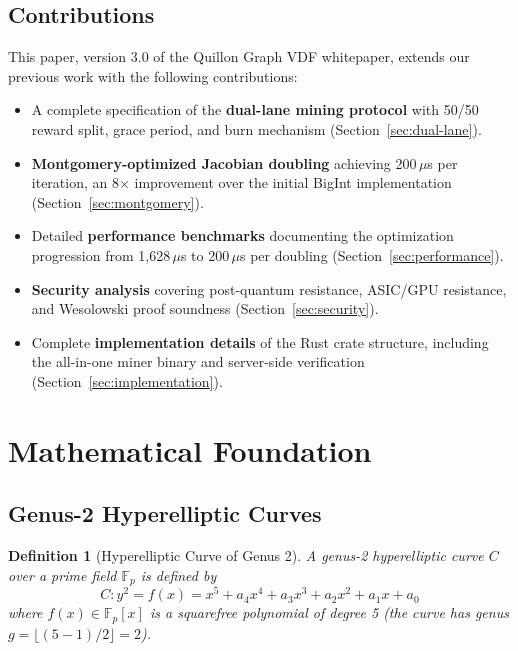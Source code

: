\documentclass[11pt,a4paper]{article}
\newtheorem{definition}{Definition}[section]
\begin{document}
\subsection{Contributions}

This paper, version 3.0 of the Quillon Graph VDF whitepaper, extends our previous work \cite{qnk_vdf_v2} with the following contributions:

\begin{itemize}
    \item A complete specification of the \textbf{dual-lane mining protocol} with 50/50 reward split, grace period, and burn mechanism (Section~\ref{sec:dual-lane}).
    \item \textbf{Montgomery-optimized Jacobian doubling} achieving 200\,$\mu$s per iteration, an 8$\times$ improvement over the initial BigInt implementation (Section~\ref{sec:montgomery}).
    \item Detailed \textbf{performance benchmarks} documenting the optimization progression from 1,628\,$\mu$s to 200\,$\mu$s per doubling (Section~\ref{sec:performance}).
    \item \textbf{Security analysis} covering post-quantum resistance, ASIC/GPU resistance, and Wesolowski proof soundness (Section~\ref{sec:security}).
    \item Complete \textbf{implementation details} of the Rust crate structure, including the all-in-one miner binary and server-side verification (Section~\ref{sec:implementation}).
\end{itemize}

\section{Mathematical Foundation}
\label{sec:math}

\subsection{Genus-2 Hyperelliptic Curves}

\begin{definition}[Hyperelliptic Curve of Genus 2]
A genus-2 hyperelliptic curve $C$ over a prime field $\mathbb{F}_p$ is defined by
\begin{equation}
    C: y^2 = f(x) = x^5 + a_4 x^4 + a_3 x^3 + a_2 x^2 + a_1 x + a_0
\end{equation}
where $f(x) \in \mathbb{F}_p[x]$ is a squarefree polynomial of degree 5 (the curve has genus $g = \lfloor (5-1)/2 \rfloor = 2$).
\end{definition}
\end{document}
